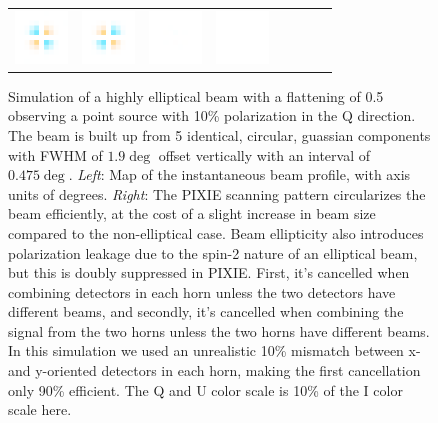 \documentclass{article}
\begin{document}
\begin{figure}
\begin{tabular}{m{35mm}rm{11mm}m{11mm}m{11mm}m{11mm}m{11mm}m{11mm}}
		\includegraphics[height=14mm]{plots/ellip_mismatch_srcs_sb_det01_crop_2.png} &
		\includegraphics[height=14mm]{plots/ellip_mismatch_srcs_sb_det23_crop_2.png} &
		\includegraphics[height=14mm]{plots/ellip_mismatch_srcs_sb_tot_crop_2.png} &
		\includegraphics[height=14mm]{plots/circular_srcs_sb_tot_crop_2.png}
	\end{tabular}
	\caption{Simulation of a highly elliptical beam with a flattening of 0.5
	observing a point source with 10\% polarization in the Q direction. The
	beam is built up from 5 identical, circular, guassian components
	with FWHM of $1.9\deg$ offset
	vertically with an interval of $0.475\deg$. \emph{Left}:
	Map of the instantaneous beam profile, with axis units of degrees. \emph{Right}:
	The PIXIE scanning pattern circularizes the beam efficiently, at the cost
	of a slight increase in beam size compared to the non-elliptical case.
	Beam ellipticity also introduces polarization leakage due to the spin-2
	nature of an elliptical beam, but this is doubly suppressed in PIXIE.
	First, it's cancelled when combining detectors in each horn unless
	the two detectors have different beams, and secondly, it's cancelled
	when combining the signal from the two horns unless the two horns
	have different beams. In this simulation we used an unrealistic
	10\% mismatch between x- and y-oriented detectors in each horn, making
	the first cancellation only 90\% efficient. The Q and U color scale is
	10\% of the I color scale here.}
	\label{fig:src_leak}
\end{figure}
\end{document}
